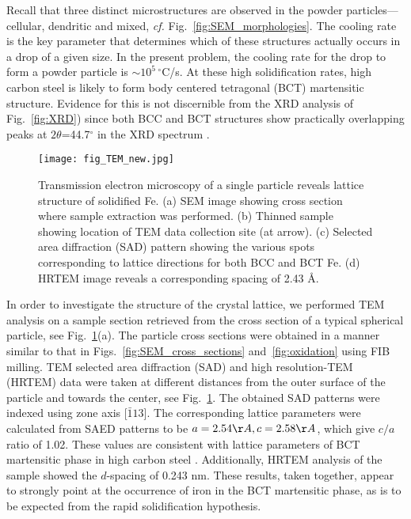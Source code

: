 \documentclass[11pt]{article}
\begin{document}
Recall that three distinct microstructures are observed in the powder particles---cellular, dendritic and mixed, \emph{cf.} Fig.~\ref{fig:SEM_morphologies}. The cooling rate is the key parameter that determines which of these structures actually occurs in a drop of a given size. In the present problem, the cooling rate for the drop to form a powder particle is $\sim 10^5\,^\circ$C/s. At these high solidification rates, high carbon steel is likely to form body centered tetragonal (BCT) martensitic structure\cite{krauss1999martensite}. Evidence for this is not discernible from the XRD analysis of Fig.~\ref{fig:XRD}) since both BCC and BCT structures show practically overlapping peaks at  $2\theta$=44.7$^\circ$ in the XRD spectrum \cite{chen2018cubic}.

\begin{figure}[h]
\centering
\texttt{[image: fig\_TEM\_new.jpg]}  
\caption{Transmission electron microscopy of a single particle reveals lattice structure of solidified Fe. (a) SEM image showing cross section where sample extraction was performed. (b) Thinned sample showing location of TEM data collection site (at arrow). (c) Selected area diffraction (SAD) pattern showing the various spots corresponding to lattice directions for both BCC and BCT Fe. (d) HRTEM image reveals a corresponding spacing of 2.43 \AA .}
\label{fig:TEM}
\end{figure}

In order to investigate the structure of the crystal lattice, we performed TEM analysis on a sample section retrieved from the cross section of a typical spherical particle, see Fig.~\ref{fig:TEM}(a). The particle cross sections were obtained in a manner similar to that in Figs.~\ref{fig:SEM_cross_sections} and~\ref{fig:oxidation} using FIB milling. TEM selected area diffraction (SAD) and high resolution-TEM (HRTEM) data were taken at different distances from the outer surface of the particle and towards the center, see Fig.~\ref{fig:TEM}. The obtained SAD patterns were indexed using zone axis [$\bar{1}13$]. The corresponding lattice parameters were calculated from SAED patterns to be $a=2.54\AA,  c=2.58\AA$, which give $c/a$ ratio of 1.02. These values are consistent with lattice parameters of BCT martensitic phase in high carbon steel \cite{lu2017effect}. Additionally, HRTEM analysis of the sample showed the $d$-spacing of 0.243 nm. These results, taken together, appear to strongly point at the occurrence of iron in the BCT martensitic phase, as is to be expected from the rapid solidification hypothesis.
\end{document}
